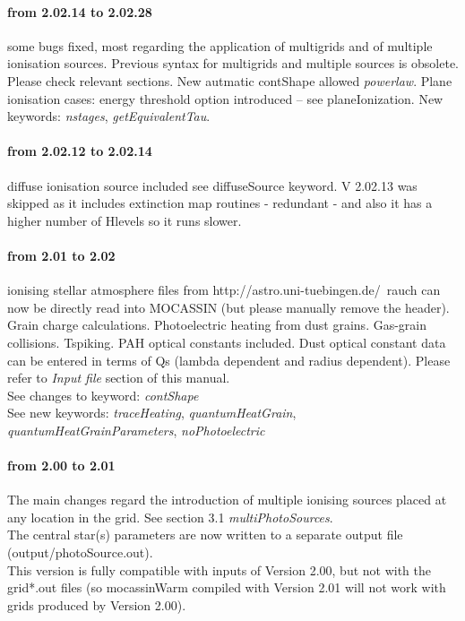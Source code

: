 \documentclass[11pt]{article}
\begin{document}
\paragraph{from 2.02.14 to 2.02.28} some bugs fixed, most regarding the application of multigrids and of multiple ionisation sources. Previous syntax for multigrids and multiple sources is obsolete. Please check relevant sections. New autmatic contShape allowed {\it powerlaw}. Plane ionisation cases: energy threshold option introduced -- see planeIonization. New keywords: {\it nstages}, {\it getEquivalentTau}.
\paragraph{from 2.02.12 to 2.02.14} diffuse ionisation source included see diffuseSource keyword. V 2.02.13 was skipped as it includes extinction map routines - redundant - and also it has a higher number of Hlevels so it runs slower. 

\paragraph {from 2.01 to 2.02}  ionising stellar atmosphere files from  http://astro.uni-tuebingen.de/~rauch can now be directly read into MOCASSIN (but please manually remove the header). Grain charge calculations. Photoelectric heating from dust grains. Gas-grain collisions. Tspiking. 
PAH optical constants included. Dust optical constant data can be entered in terms of Qs (lambda dependent and radius dependent).
Please refer to {\it Input file} section of this manual. \\
See changes to keyword: {\it contShape}\\
See new keywords: {\it traceHeating}, {\it quantumHeatGrain}, {\it quantumHeatGrainParameters}, 
{\it noPhotoelectric}
\\
\paragraph {from 2.00 to 2.01} The main changes regard the introduction of multiple ionising sources placed at any 
location in the grid. See section 3.1 {\it multiPhotoSources}. \\
The central star(s) parameters are now written to a separate output file (output/photoSource.out). \\
This version is fully compatible with inputs of Version 2.00, but not with the grid*.out files (so mocassinWarm compiled with Version 2.01 will not work with grids produced by Version 2.00).\\
\end{document}
